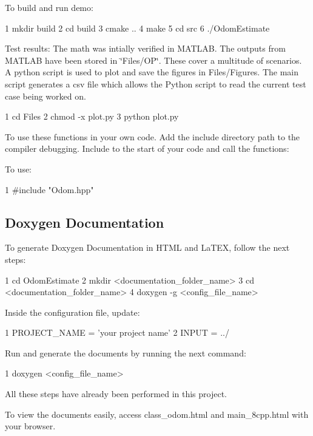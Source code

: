 \begin{DoxyItemize}
\item To build and run demo\+: 
\begin{DoxyCode}
1 mkdir build
2 cd build
3 cmake ..
4 make
5 cd src
6 ./OdomEstimate
\end{DoxyCode}

\item Test results\+: The math was intially verified in M\+A\+T\+L\+AB. The outputs from M\+A\+T\+L\+AB have been stored in \char`\"{}\+Files/\+O\+P\char`\"{}. These cover a multitude of scenarios. A python script is used to plot and save the figures in Files/\+Figures. The main script generates a csv file which allows the Python script to read the current test case being worked on. 
\begin{DoxyCode}
1 cd Files
2 chmod -x plot.py
3 python plot.py
\end{DoxyCode}
 To use these functions in your own code. Add the include directory path to the compiler debugging. Include to the start of your code and call the functions\+:
\item To use\+: 
\begin{DoxyCode}
1 #include "Odom.hpp" 
\end{DoxyCode}

\end{DoxyItemize}

\subsection*{Doxygen Documentation}

To generate Doxygen Documentation in H\+T\+ML and La\+T\+EX, follow the next steps\+:


\begin{DoxyCode}
1 cd OdomEstimate
2 mkdir <documentation\_folder\_name>
3 cd <documentation\_folder\_name>
4 doxygen -g <config\_file\_name>
\end{DoxyCode}
 Inside the configuration file, update\+: 
\begin{DoxyCode}
1 PROJECT\_NAME = 'your project name'
2 INPUT = ../
\end{DoxyCode}
 Run and generate the documents by running the next command\+: 
\begin{DoxyCode}
1 doxygen <config\_file\_name>
\end{DoxyCode}
 All these steps have already been performed in this project.

To view the documents easily, access {\ttfamily class\+\_\+odom.\+html} and {\ttfamily main\+\_\+8cpp.\+html} with your browser.

